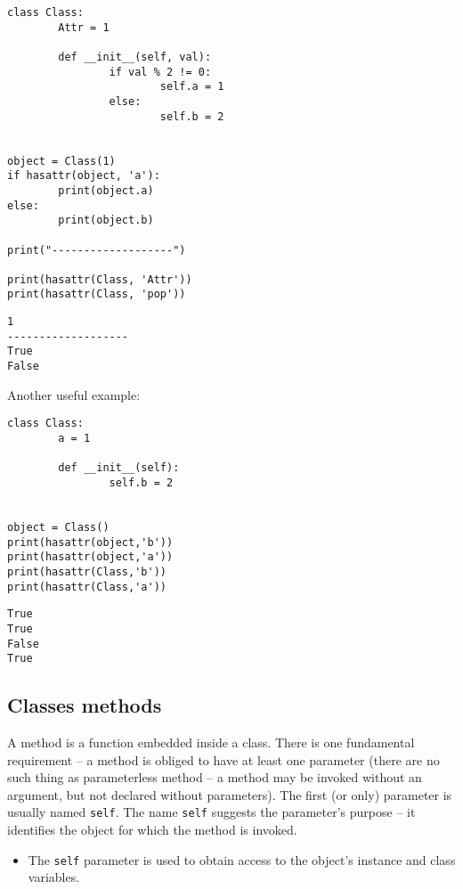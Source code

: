 \documentclass[11pt]{article}
\begin{document}
\begin{verbatim}
class Class:
        Attr = 1

        def __init__(self, val):
                if val % 2 != 0:
                        self.a = 1
                else:
                        self.b = 2


object = Class(1)
if hasattr(object, 'a'):
        print(object.a)
else:
        print(object.b)

print("-------------------")

print(hasattr(Class, 'Attr'))
print(hasattr(Class, 'pop'))

\end{verbatim}

\begin{verbatim}
1
-------------------
True
False
\end{verbatim}

\break
\newline

Another useful example:

\begin{verbatim}
class Class:
        a = 1

        def __init__(self):
                self.b = 2


object = Class()
print(hasattr(object,'b'))
print(hasattr(object,'a'))
print(hasattr(Class,'b'))
print(hasattr(Class,'a'))

\end{verbatim}

\begin{verbatim}
True
True
False
True
\end{verbatim}
\newpage

\subsection{Classes methods}
\label{sec:orgd34e371}
A method is a function embedded inside a class. There is one
fundamental requirement – a method is obliged to have at least one
parameter (there are no such thing as parameterless method – a method
may be invoked without an argument, but not declared without
parameters). The first (or only) parameter is usually named
\texttt{self}. The name \texttt{self} suggests the parameter’s purpose – it
identifies the object for which the method is invoked. 

\begin{itemize}
\item The \texttt{self} parameter is used to obtain access to the object’s
instance and class variables.
\end{itemize}
\end{document}

